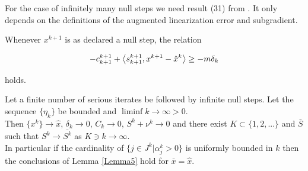 
For the case of infinitely many null steps we need result (31) from \cite{Hare2016}. It only depends on the definitions of the augmented linearization error and subgradient.

Whenever \(x^{k+1}\) is as declared a null step, the relation 

\begin{equation}
	-c^{k+1}_{k+1} + \left\langle s^{k+1}_{k+1}, x^{k+1}-\hat{x}^k\right\rangle \geq -m\delta_k
\label{no_ls}
\end{equation}

holds.

\begin{theorem} 
	Let a finite number of serious iterates be followed by infinite null steps. Let the sequence \(\{\eta_k\}\) be bounded and \(\liminf k \to \infty > 0\). \\
	Then \(\{x^k\} \to \hat{x}\), \(\delta_k \to 0\), \(C_k \to 0\), \(S^k + \nu^k \to 0\) and there exist \(K\subset \{1,2,...\}\) and \(\bar{S}\) such that \(S^k \to \bar{S^k}\) as \(K \ni k \to \infty\). \\
	In particular if the cardinality of \(\{j \in J^k|\alpha_j^k > 0 \}\) is uniformly bounded in \(k\) then the conclusions of Lemma \ref{Lemma5} hold for \(\bar{x} = \hat{x}\). 
\end{theorem}

